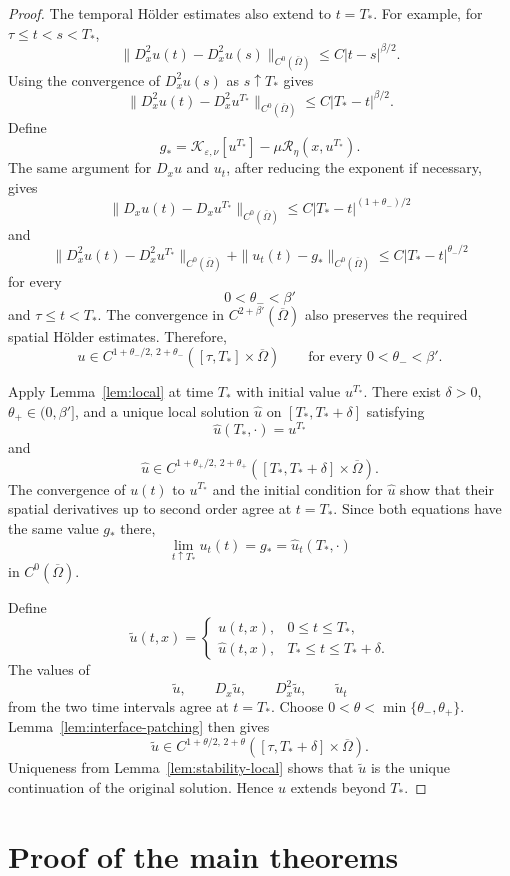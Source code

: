\documentclass[11pt]{article}
\theoremstyle{remark}
\newcommand{\cT}{\mathcal{R}}
\begin{document}
\begin{proof}
The temporal H\"older estimates also extend to $t=T_*$. For example,
for $\tau\leq t<s<T_*$,
\[
\|D_x^2u(t)-D_x^2u(s)\|_{C^0(\overline{\Omega})}
\leq
C|t-s|^{\beta/2}.
\]
Using the convergence of $D_x^2u(s)$ as $s\uparrow T_*$ gives
\[
\|D_x^2u(t)-D_x^2u^{T_*}\|_{C^0(\overline{\Omega})}
\leq
C|T_*-t|^{\beta/2}.
\]
Define
\[
g_*=
\mathcal{K}_{\varepsilon,\nu}[u^{T_*}]
-\mu\cT_\eta(x,u^{T_*}).
\]
The same argument for $D_xu$ and $u_t$, after reducing the exponent if necessary, gives
\[
\|D_xu(t)-D_xu^{T_*}\|_{C^0(\overline{\Omega})}
\leq C|T_*-t|^{(1+\theta_-)/2}
\]
and
\[
\|D_x^2u(t)-D_x^2u^{T_*}\|_{C^0(\overline{\Omega})}
+
\|u_t(t)-g_*\|_{C^0(\overline{\Omega})}
\leq C|T_*-t|^{\theta_-/2}
\]
for every
\[
0<\theta_-<\beta'
\]
and $\tau\leq t<T_*$.
The convergence in
$C^{2+\beta'}(\overline{\Omega})$ also preserves the required spatial
H\"older estimates. Therefore,
\[
u\in
C^{1+\theta_-/2,\,2+\theta_-}
([\tau,T_*]\times\overline{\Omega})
\qquad
\text{for every }0<\theta_-<\beta'.
\]

Apply Lemma~\ref{lem:local} at time $T_*$ with initial value $u^{T_*}$.
There exist $\delta>0$, $\theta_+\in(0,\beta']$, and a unique local
solution $\widehat{u}$ on $[T_*,T_*+\delta]$ satisfying
\[
\widehat{u}(T_*,\cdot)=u^{T_*}
\]
and
\[
\widehat{u}\in
C^{1+\theta_+/2,\,2+\theta_+}
([T_*,T_*+\delta]\times\overline{\Omega}).
\]
The convergence of $u(t)$ to $u^{T_*}$ and the initial condition for $\widehat{u}$ show that their spatial derivatives up to second order agree at $t=T_*$. Since both equations have the same value $g_*$ there,
\[
\lim_{t\uparrow T_*}u_t(t)=g_*=\widehat{u}_t(T_*,\cdot)
\]
in $C^0(\overline{\Omega})$.

Define
\[
\widetilde{u}(t,x)
=
\begin{cases}
u(t,x), & 0\leq t\leq T_*,\\
\widehat{u}(t,x), & T_*\leq t\leq T_*+\delta.
\end{cases}
\]
The values of
\[
\widetilde{u},\qquad
D_x\widetilde{u},\qquad
D_x^2\widetilde{u},\qquad
\widetilde{u}_t
\]
from the two time intervals agree at $t=T_*$. Choose
$0<\theta<\min\{\theta_-,\theta_+\}$. Lemma~\ref{lem:interface-patching} then gives
\[
\widetilde{u}\in
C^{1+\theta/2,\,2+\theta}
([\tau,T_*+\delta]\times\overline{\Omega}).
\]
Uniqueness from Lemma~\ref{lem:stability-local} shows that
$\widetilde{u}$ is the unique continuation of the original solution.
Hence $u$ extends beyond $T_*$.
\end{proof}

\section{Proof of the main theorems}
\label{sec:proof-main}
\end{document}
